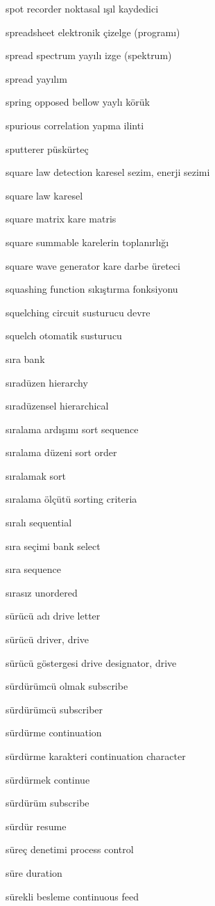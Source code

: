 \documentclass[12pt,fleqn]{article}\usepackage{../../common}
\begin{document}
spot recorder noktasal ışıl kaydedici

spreadsheet elektronik çizelge (programı)

spread spectrum yayılı izge (spektrum)

spread yayılım

spring opposed bellow yaylı körük

spurious correlation yapma ilinti

sputterer püskürteç

square law detection karesel sezim, enerji sezimi

square law karesel

square matrix kare matris

square summable karelerin toplanırlığı

square wave generator kare darbe üreteci

squashing function sıkıştırma fonksiyonu

squelching circuit susturucu devre

squelch otomatik susturucu

sıra bank

sıradüzen hierarchy

sıradüzensel hierarchical

sıralama ardışımı sort sequence

sıralama düzeni sort order

sıralamak sort

sıralama ölçütü sorting criteria

sıralı sequential

sıra seçimi bank select

sıra sequence

sırasız unordered

sürücü adı drive letter

sürücü driver, drive

sürücü göstergesi drive designator, drive

sürdürümcü olmak subscribe

sürdürümcü subscriber

sürdürme continuation

sürdürme karakteri continuation character

sürdürmek continue

sürdürüm subscribe

sürdür resume

süreç denetimi process control

süre duration

sürekli besleme continuous feed
\end{document}
